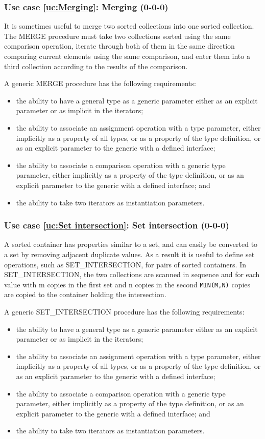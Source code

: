 \documentclass{article}
\newcounter{usecase}
\newcounter{requirement}
\newcommand{\newusecase}[2]{
\refstepcounter{usecase}\label{uc:#1}
\subsubsection{Use case \ref{uc:#1}: #1 (#2)}}
\begin{document}
\newusecase{Merging}{0-0-0}
It is sometimes useful to merge two sorted collections into one
sorted collection. The {\rm MERGE} procedure must take two
collections sorted using the same comparison operation, iterate
through both of them in the same direction comparing current elements
using the same comparison, and enter them into a third collection
according to the results of the comparison.

A generic {\rm MERGE} procedure has the following
requirements:
\begin{itemize}
\item the ability to have a general type as a generic parameter
  either as an explicit parameter or as implicit in the iterators;

\item the ability to associate an assignment operation with a type
  parameter, either implicitly as a property of all types, or
  as a property of the type definition, or as an explicit parameter to
  the generic with a defined interface;

\item the ability to associate a comparison operation with a generic
  type parameter, either implicitly
  as a property of the type definition, or as an explicit parameter to
  the generic with a defined interface; and

\item the ability to take two iterators as instantiation
  parameters.

\end{itemize}

\newusecase{Set intersection}{0-0-0}
A sorted container has properties similar to a set, and can easily be
converted to a set by removing adjacent duplicate values.  As a result
it is useful to define set operations, such as {\rm SET\_INTERSECTION},
for pairs of sorted containers.  In {\rm SET\_INTERSECTION}, the two
collections are scanned in sequence and for each value with m
copies in the first set and n copies in the second {\tt MIN(M,N)} copies
are copied to the container holding the intersection.

A generic {\rm SET\_INTERSECTION} procedure has the following
requirements:
\begin{itemize}
\item the ability to have a general type as a generic parameter
  either as an explicit parameter or as implicit in the iterators;

\item the ability to associate an assignment operation with a type
  parameter, either implicitly as a property of all types, or
  as a property of the type definition, or as an explicit parameter to
  the generic with a defined interface;

\item the ability to associate a comparison operation with a generic
  type parameter, either implicitly
  as a property of the type definition, or as an explicit parameter to
  the generic with a defined interface; and

\item the ability to take two iterators as instantiation
  parameters.

\end{itemize}
\end{document}
